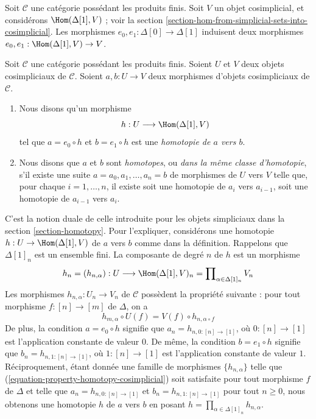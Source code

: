\noindent
Soit $\mathcal{C}$ une catégorie possédant les produits finis. Soit $V$ un
objet cosimplicial, et considérons $\Hom(\Delta[1], V)$ ; voir la
section \ref{section-hom-from-simplicial-sets-into-cosimplicial}.
Les morphismes $e_0, e_1 : \Delta[0] \to \Delta[1]$
induisent deux morphismes $e_0, e_1 : \Hom(\Delta[1], V) \to V$.

\begin{definition}
\label{definition-homotopy-cosimplicial}
Soit $\mathcal{C}$ une catégorie possédant les produits finis.
Soient $U$ et $V$ deux objets cosimpliciaux de $\mathcal{C}$.
Soient $a, b : U \to V$ deux morphismes d'objets cosimpliciaux
de $\mathcal{C}$.
\begin{enumerate}
\item Nous disons qu'un morphisme
$$
h : U \longrightarrow \Hom(\Delta[1], V)
$$
tel que $a = e_0 \circ h$ et $b = e_1 \circ h$ est une
{\it homotopie de $a$ vers $b$}.
\item Nous disons que $a$ et $b$ sont {\it homotopes}, ou
{\it dans la même classe d'homotopie}, s'il existe une suite
$a = a_0, a_1, \ldots, a_n = b$ de morphismes de $U$ vers $V$
telle que, pour chaque $i = 1, \ldots, n$, il existe soit une
homotopie de $a_i$ vers $a_{i - 1}$, soit une homotopie
de $a_{i - 1}$ vers $a_i$.
\end{enumerate}
\end{definition}

\noindent
C'est la notion duale de celle introduite pour les objets simpliciaux dans la
section \ref{section-homotopy}. Pour l'expliquer, considérons une
homotopie $h : U \to \Hom(\Delta[1], V)$ de $a$ vers $b$ comme dans la
définition. Rappelons que $\Delta[1]_n$ est un ensemble fini.
La composante de degré $n$ de $h$ est un morphisme
$$
h_n = (h_{n, \alpha}) :
U
\longrightarrow
\Hom(\Delta[1], V)_n =
\prod\nolimits_{\alpha \in \Delta[1]_n} V_n
$$
Les morphismes $h_{n, \alpha} : U_n \to V_n$ de $\mathcal{C}$ possèdent la
propriété suivante : pour tout morphisme $f : [n] \to [m]$
de $\Delta$, on a
\begin{equation}
\label{equation-property-homotopy-cosimplicial}
h_{m, \alpha} \circ U(f) = V(f) \circ h_{n, \alpha \circ f}
\end{equation}
De plus, la condition $a = e_0 \circ h$ signifie que
$a_n = h_{n, 0 : [n] \to [1]}$, où $0 : [n] \to [1]$ est l'application
constante de valeur $0$. De même, la condition $b = e_1 \circ h$ signifie que
$b_n = h_{n, 1 : [n] \to [1]}$, où $1 : [n] \to [1]$ est l'application
constante de valeur $1$.
Réciproquement, étant donnée une famille de morphismes $\{h_{n, \alpha}\}$
telle que (\ref{equation-property-homotopy-cosimplicial}) soit satisfaite
pour tout morphisme $f$ de $\Delta$ et telle que
$a_n = h_{n, 0 : [n] \to [1]}$ et $b_n = h_{n, 1 : [n] \to [1]}$
pour tout $n \geq 0$, nous obtenons une homotopie $h$ de $a$ vers $b$ en posant
$h = \prod_{\alpha \in \Delta[1]_n} h_{n, \alpha}$.


